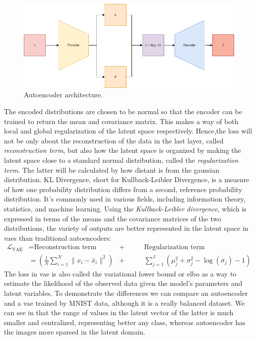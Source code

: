 \documentclass[../main.tex]{subfiles}
\begin{document}
\begin{figure}[H]
	\centering
	\includegraphics[width=15cm]{imgs/relatedwork/vae}
	\caption{Autoencoder architecture.}
	\label{fig:related-vae}
\end{figure}
The encoded distributions are chosen to be normal so that the encoder can be trained to return the mean and covariance matrix. This makes a way of both local and global regularization of the latent space respectively. Hence,the loss will not be only about the reconstruction of the data in the last layer, called \textit{reconstruction term}, but also how the latent space is organized by making the latent space close to a standard normal distribution, called the \textit{regularization term}. The latter will be calculated by how distant is from the gaussian distribution.
KL Divergence, short for Kullback-Leibler Divergence, is a measure of how one probability distribution differs from a second, reference probability distribution. It's commonly used in various fields, including information theory, statistics, and machine learning.
Using the \textit{Kullback-Leibler divergence}, which is expressed in terms of the means and the covariance matrices of the two distributions, the variety of outputs are better represented in the latent space in \gls{vae}s than traditional autoencoders:
\begin{equation}
	\label{eq:vae}
	\begin{align*}
		\mathcal{L}_{\text{VAE}} &= \text{Reconstruction term} &+&\qquad \text{Regularization term}\\
		&= (\frac{1}{N} \sum_{i=1}^{N} \| x_i - \bar{x}_i \|^2) &+& \qquad \sum_{j=1}^{J} \left(\mu_j^2 + \sigma_j^2  - \log(\sigma_j)  - 1 \right)
	\end{align*}
\end{equation}
The loss in \gls{vae} is also called the variational lower bound or \gls{elbo} as a way to estimate the likelihood of the observed data given the model's parameters and latent variables. To demonstrate the differences we can compare an autoencoder and a \gls{vae} trained by MNIST data, although it is a really balanced dataset. We can see in  that the range of values in the latent vector of the latter is much smaller and centralized, representing better any class, whereas autoencoder has the images more sparsed in the latent domain. %
\end{document}
